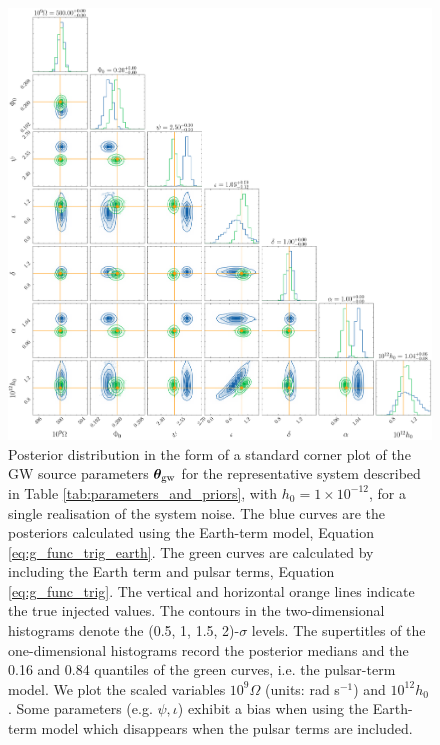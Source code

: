 \documentclass[fleqn,usenatbib,useAMS]{mnras}
\begin{document}
	\begin{figure}
	\includegraphics[width=\textwidth, height =\textwidth ]{images/corner_highSNR_compare}
	\caption{Posterior distribution in the form of a standard corner plot of the GW source parameters $\boldsymbol{\theta}_{\rm gw}$ for the representative system described in Table \ref{tab:parameters_and_priors}, with $h_0 = 1 \times 10^{-12}$, for a single realisation of the system noise. The blue curves are the posteriors calculated using the Earth-term model, Equation \eqref{eq:g_func_trig_earth}. The green curves are calculated by including the Earth term and pulsar terms, Equation \eqref{eq:g_func_trig}. The vertical and horizontal orange lines indicate the true injected values. The contours in the two-dimensional histograms denote the (0.5, 1, 1.5, 2)-$\sigma$ levels. The supertitles of the one-dimensional histograms record the posterior medians and the 0.16 and 0.84 quantiles of the green curves, i.e. the pulsar-term model. We plot the scaled variables $10^9 \Omega$ (units: rad s$^{-1}$) and $10^{12} h_0$. Some parameters (e.g. $\psi, \iota$) exhibit a bias when using the Earth-term model which disappears when the pulsar terms are included.}
	\label{fig:corner_plot_compare_high}
\end{figure}
\end{document}
